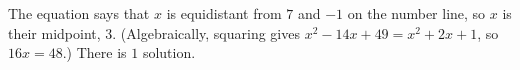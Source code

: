 The equation says that $x$ is equidistant from $7$ and $-1$ on the number line, so $x$ is their midpoint, $3$. (Algebraically, squaring gives $x^2-14x+49=x^2+2x+1$, so $16x=48$.) There is $\boxed{1}$ solution.
